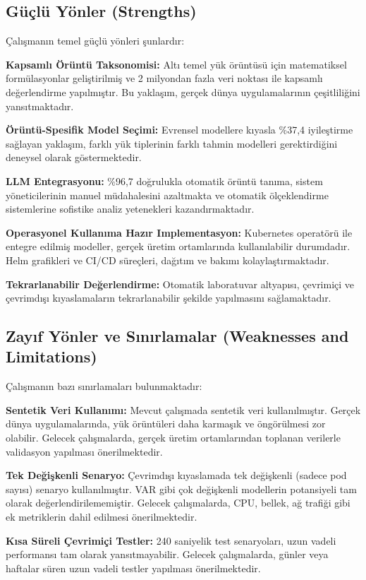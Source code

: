 \subsection{Güçlü Yönler (Strengths)}

Çalışmanın temel güçlü yönleri şunlardır:

\textbf{Kapsamlı Örüntü Taksonomisi:} Altı temel yük örüntüsü için matematiksel formülasyonlar geliştirilmiş ve 2 milyondan fazla veri noktası ile kapsamlı değerlendirme yapılmıştır. Bu yaklaşım, gerçek dünya uygulamalarının çeşitliliğini yansıtmaktadır.

\textbf{Örüntü-Spesifik Model Seçimi:} Evrensel modellere kıyasla \%37,4 iyileştirme sağlayan yaklaşım, farklı yük tiplerinin farklı tahmin modelleri gerektirdiğini deneysel olarak göstermektedir.

\textbf{LLM Entegrasyonu:} \%96,7 doğrulukla otomatik örüntü tanıma, sistem yöneticilerinin manuel müdahalesini azaltmakta ve otomatik ölçeklendirme sistemlerine sofistike analiz yetenekleri kazandırmaktadır.

\textbf{Operasyonel Kullanıma Hazır Implementasyon:} Kubernetes operatörü ile entegre edilmiş modeller, gerçek üretim ortamlarında kullanılabilir durumdadır. Helm grafikleri ve CI/CD süreçleri, dağıtım ve bakımı kolaylaştırmaktadır.

\textbf{Tekrarlanabilir Değerlendirme:} Otomatik laboratuvar altyapısı, çevrimiçi ve çevrimdışı kıyaslamaların tekrarlanabilir şekilde yapılmasını sağlamaktadır.

\subsection{Zayıf Yönler ve Sınırlamalar (Weaknesses and Limitations)}

Çalışmanın bazı sınırlamaları bulunmaktadır:

\textbf{Sentetik Veri Kullanımı:} Mevcut çalışmada sentetik veri kullanılmıştır. Gerçek dünya uygulamalarında, yük örüntüleri daha karmaşık ve öngörülmesi zor olabilir. Gelecek çalışmalarda, gerçek üretim ortamlarından toplanan verilerle validasyon yapılması önerilmektedir.

\textbf{Tek Değişkenli Senaryo:} Çevrimdışı kıyaslamada tek değişkenli (sadece pod sayısı) senaryo kullanılmıştır. VAR gibi çok değişkenli modellerin potansiyeli tam olarak değerlendirilememiştir. Gelecek çalışmalarda, CPU, bellek, ağ trafiği gibi ek metriklerin dahil edilmesi önerilmektedir.

\textbf{Kısa Süreli Çevrimiçi Testler:} 240 saniyelik test senaryoları, uzun vadeli performansı tam olarak yansıtmayabilir. Gelecek çalışmalarda, günler veya haftalar süren uzun vadeli testler yapılması önerilmektedir.

